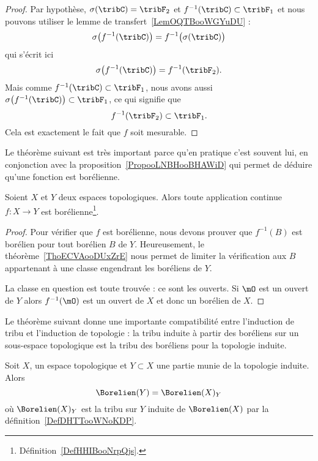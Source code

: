 \begin{proof}
    Par hypothèse, \( \sigma(\tribC)=\tribF_2\) et \( f^{-1}(\tribC)\subset \tribF_1\) et nous pouvons utiliser le lemme de transfert~\ref{LemOQTBooWGYuDU} :
    \begin{equation}
        \sigma\big( f^{-1}(\tribC) \big)=f^{-1}\big( \sigma(\tribC) \big)
    \end{equation}
    qui s'écrit ici
    \begin{equation}
        \sigma\big( f^{-1}(\tribC) \big)=f^{-1}(\tribF_2).
    \end{equation}
    Mais comme \( f^{-1}(\tribC)\subset \tribF_1\), nous avons aussi \( \sigma\big( f^{-1}(\tribC) \big)\subset \tribF_1\), ce qui signifie que
    \begin{equation}
        f^{-1}(\tribF_2)\subset \tribF_1.
    \end{equation}
    Cela est exactement le fait que \( f\) soit mesurable.
\end{proof}

Le théorème suivant est très important parce qu'en pratique c'est souvent lui, en conjonction avec la proposition~\ref{PropooLNBHooBHAWiD} qui permet de déduire qu'une fonction est borélienne.
\begin{theorem}     \label{ThoJDOKooKaaiJh}
    Soient \( X\) et \( Y\) deux espaces topologiques. Alors toute application continue \( f\colon X\to Y\) est borélienne\footnote{Définition~\ref{DefHHIBooNrpQjs}.}.
\end{theorem}

\begin{proof}
    Pour vérifier que \( f\) est borélienne, nous devons prouver que \( f^{-1}(B)\) est borélien pour tout borélien \( B\) de \( Y\). Heureusement, le théorème~\ref{ThoECVAooDUxZrE} nous permet de limiter la vérification aux \( B\) appartenant à une classe engendrant les boréliens de \( Y\).

    La classe en question est toute trouvée : ce sont les ouverts. Si \( \mO\) est un ouvert de \( Y\) alors \( f^{-1}(\mO)\) est un ouvert de \( X\) et donc un borélien de \( X\).
\end{proof}

Le théorème suivant donne une importante compatibilité entre l'induction de tribu et l'induction de topologie : la tribu induite à partir des boréliens sur un sous-espace topologique est la tribu des boréliens pour la topologie induite.
\begin{theorem}     \label{ThoSVTHooChgvYa}
    Soit \( X\), un espace topologique et \( Y\subset X\) une partie munie de la topologie induite. Alors
    \begin{equation}
        \Borelien(Y)=\Borelien(X)_Y
    \end{equation}
    où \( \Borelien(X)_Y\) est la tribu sur \( Y\) induite de \( \Borelien(X)\) par la définition~\ref{DefDHTTooWNoKDP}.
\end{theorem}

